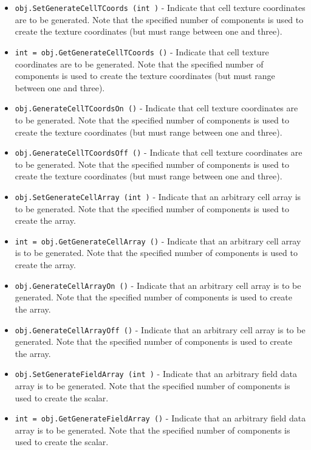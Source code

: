 \begin{itemize}
\item  \verb|obj.SetGenerateCellTCoords (int )| -  Indicate that cell texture coordinates are to be generated. Note that
 the specified number of components is used to create the texture
 coordinates (but must range between one and three).

\item  \verb|int = obj.GetGenerateCellTCoords ()| -  Indicate that cell texture coordinates are to be generated. Note that
 the specified number of components is used to create the texture
 coordinates (but must range between one and three).

\item  \verb|obj.GenerateCellTCoordsOn ()| -  Indicate that cell texture coordinates are to be generated. Note that
 the specified number of components is used to create the texture
 coordinates (but must range between one and three).

\item  \verb|obj.GenerateCellTCoordsOff ()| -  Indicate that cell texture coordinates are to be generated. Note that
 the specified number of components is used to create the texture
 coordinates (but must range between one and three).

\item  \verb|obj.SetGenerateCellArray (int )| -  Indicate that an arbitrary cell array is to be generated. Note that the
 specified number of components is used to create the array.

\item  \verb|int = obj.GetGenerateCellArray ()| -  Indicate that an arbitrary cell array is to be generated. Note that the
 specified number of components is used to create the array.

\item  \verb|obj.GenerateCellArrayOn ()| -  Indicate that an arbitrary cell array is to be generated. Note that the
 specified number of components is used to create the array.

\item  \verb|obj.GenerateCellArrayOff ()| -  Indicate that an arbitrary cell array is to be generated. Note that the
 specified number of components is used to create the array.

\item  \verb|obj.SetGenerateFieldArray (int )| -  Indicate that an arbitrary field data array is to be generated. Note
 that the specified number of components is used to create the scalar.

\item  \verb|int = obj.GetGenerateFieldArray ()| -  Indicate that an arbitrary field data array is to be generated. Note
 that the specified number of components is used to create the scalar.


\end{itemize}
